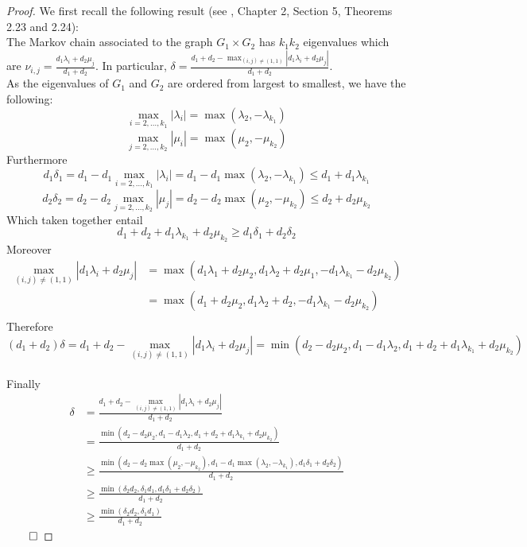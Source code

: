 \begin{proof}
We first recall the following result (see \cite{CDS80}, Chapter 2, Section 5, Theorems 2.23 and 2.24):\\
The Markov chain associated to the graph $G_1 \times G_2$ has $k_1k_2$ eigenvalues which are $\nu_{i,j} = \frac{d_1\lambda_i + d_2\mu_j}{d_1 + d_2}$. In particular, $\delta = \frac{d_1 + d_2 - \max_{(i,j) \not = (1,1)}|d_1\lambda_i  + d_2\mu_j|}{d_1 + d_2}$.\\
As the eigenvalues of $G_1$ and $G_2$ are ordered from largest to smallest, we have the following:
$$\max_{i=2,...,k_1}|\lambda_i| = \max(\lambda_2,-\lambda_{k_1})$$
$$\max_{j=2,...,k_2}|\mu_i| = \max(\mu_2,-\mu_{k_2})$$
Furthermore
$$d_1\delta_1 = d_1 - d_1\max_{i=2,...,k_1}|\lambda_i| = d_1 - d_1\max(\lambda_2,-\lambda_{k_1}) \leq d_1 + d_1\lambda_{k_1}$$
$$d_2\delta_2 = d_2 - d_2\max_{j=2,...,k_2}|\mu_j| = d_2 - d_2\max(\mu_2,-\mu_{k_2}) \leq d_2 + d_2\mu_{k_2}$$
Which taken together entail\\
$$d_1 + d_2 + d_1\lambda_{k_1} + d_2\mu_{k_2} \geq d_1\delta_1 + d_2\delta_2$$
Moreover
\begin{align*}
  \max_{(i,j) \not = (1,1)}|d_1\lambda_i  + d_2\mu_j| &= \max\left(d_1\lambda_1 + d_2\mu_2, d_1\lambda_2 + d_2\mu_1, - d_1\lambda_{k_1} - d_2\mu_{k_2}\right)\\ 
  &= \max\left(d_1 + d_2\mu_2, d_1\lambda_2 + d_2, - d_1\lambda_{k_1} - d_2\mu_{k_2}\right)\\
\end{align*}
Therefore
$$(d_1 + d_2)\delta = d_1 + d_2 - \max_{(i,j) \not = (1,1)}|d_1\lambda_i  + d_2\mu_j| = \min\left(d_2 - d_2\mu_2, d_1 - d_1\lambda_2, d_1 + d_2 + d_1\lambda_{k_1} + d_2\mu_{k_2}\right)$$\\
Finally
\begin{align*}
  \delta &= \frac{d_1 + d_2 - \max_{(i,j) \not = (1,1)}|d_1\lambda_i  + d_2\mu_j|}{d_1 + d_2}\\
  &= \frac{\min\left(d_2 - d_2\mu_2, d_1 - d_1\lambda_2, d_1 + d_2 + d_1\lambda_{k_1} + d_2\mu_{k_2}\right)}{d_1 + d_2}\\
  &\geq \frac{\min\left(d_2 - d_2\max(\mu_2,-\mu_{k_2}), d_1 - d_1\max(\lambda_2,-\lambda_{k_1}), d_1\delta_1 + d_2\delta_2\right)}{d_1 + d_2}\\
  &\geq \frac{\min\left(\delta_2d_2, \delta_1d_1, d_1\delta_1 + d_2\delta_2\right)}{d_1 + d_2}\\
  &\geq \frac{\min\left(\delta_2d_2, \delta_1d_1\right)}{d_1 + d_2}
\end{align*}
$\qed$
\end{proof}
